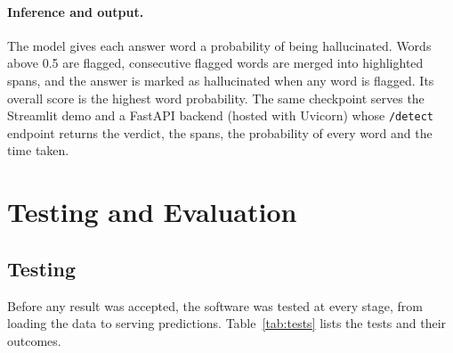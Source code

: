 \paragraph{Inference and output.} The model gives each answer word a
probability of being hallucinated. Words above 0.5 are flagged, consecutive
flagged words are merged into highlighted spans, and the answer is marked as
hallucinated when any word is flagged. Its overall score is the highest word
probability. The same checkpoint serves the Streamlit demo and a FastAPI
backend (hosted with Uvicorn) whose \texttt{/detect} endpoint returns the
verdict, the spans, the probability of every word and the time taken.

\section{Testing and Evaluation}
\label{sec:eval}

\subsection{Testing}

Before any result was accepted, the software was tested at every stage, from
loading the data to serving predictions. Table~\ref{tab:tests} lists the tests
and their outcomes.

